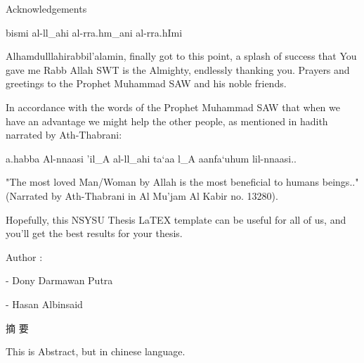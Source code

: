 \documentclass[12pt, twoside , openright]{book}
\begin{document}
	
	\begin{center}
		{\chinnesesize Acknowledgements}
	\end{center}
	\setarab
	\fullvocalize
	\arabtrue
	\begin{center}
		\begin{RLtext}
			bismi al-ll_ahi al-rra.hm_ani al-rra.hImi
		\end{RLtext}
	\end{center}
	
	Alhamdulllahirabbil'alamin, finally got to this point, a splash of success that You gave me Rabb Allah SWT is the Almighty, endlessly thanking you. Prayers and greetings to the Prophet Muhammad SAW and his noble friends.  
	
	In accordance with the words of the Prophet Muhammad SAW that when we have an advantage we might help the other people, as mentioned in hadith narrated by Ath-Thabrani:
	
	\begin{center}
		\begin{RLtext}
			a.habba Al-nnaasi 'il_A al-ll_ahi ta`aa l_A aanfa`uhum lil-nnaasi..
		\end{RLtext}
	\end{center}
	
	
	"The most loved Man/Woman by Allah is the most beneficial to humans  beings.." (Narrated by Ath-Thabrani in Al Mu'jam Al Kabir no. 13280).
	
	Hopefully, this NSYSU Thesis LaTEX template can be useful for all of us, and you'll get the best results for your thesis.
	
	\noindent
	Author :
	
	\vspace{-2em}
	- Dony Darmawan Putra
	
	\vspace{-2em}
	- Hasan Albinsaid
	
	\newpage
	\mbox{}
	\newpage
	
	
	
	
	
	\begin{center}
		{\chinnesesize 摘 要}
	\end{center}
	This is Abstract, but in chinese language. \blindtext[1]
	\newpage
	\mbox{}
	\newpage
	
	
	
\end{document}
